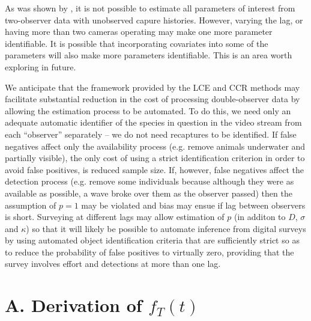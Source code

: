\documentclass[useAMS, usenatbib, referee]{biom}\usepackage[]{graphicx}\usepackage[]{color}
\begin{document}
As was shown by \cite{Stevenson+al:18}, it is not possible to estimate all parameters of interest from two-observer data with unobserved capure histories. However, varying the lag, or having more than two cameras operating may make one more parameter identifiable. It is possible that incorporating covariates into some of the parameters will also make more parameters identifiable. This is an area worth exploring in future.

We anticipate that the framework provided by the LCE and CCR methods may facilitate substantial reduction in the cost of processing double-observer data by allowing the estimation process to be automated. To do this, we need only an adequate automatic identifier of the species in question in the video stream from each ``observer'' separately -- we do not need recaptures to be identified. If false negatives affect only the availability process (e.g. remove animals underwater and partially visible), the only cost of using a strict identification criterion in order to avoid false positives, is reduced sample size. If, however, false negatives affect the detection process (e.g. remove some individuals because although they were as available as possible, a wave broke over them as the observer passed) then the assumption of $p=1$ may be violated and bias may ensue if lag between observers is short. Surveying at different lags may allow estimation of $p$ (in additon to $D$, $\sigma$ and $\kappa$) so that it will likely be possible to automate inference from digital surveys by using automated object identification criteria that are sufficiently strict so as to reduce the probability of false positives to virtually zero, providing that the survey involves effort and detections at more than one lag.


\appendix

\section{A. Derivation of $f_{T}(t)$}
\label{appx:firstpassage}
\end{document}

